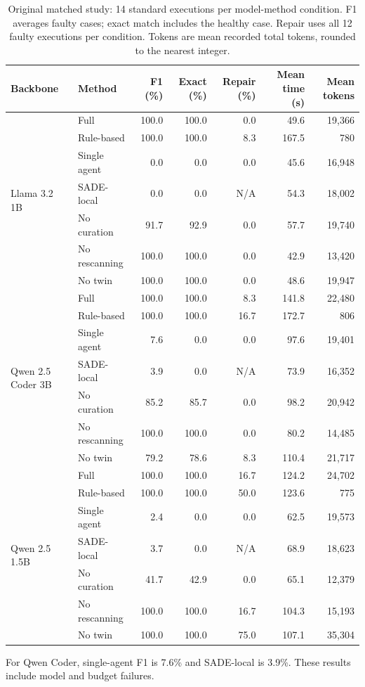 \documentclass[pdflatex,sn-mathphys-num,iicol]{sn-jnl}
\begin{document}
\begin{table}[t]
\caption{Original matched study: 14 standard executions per model-method condition. F1 averages faulty cases; exact match includes the healthy case. Repair uses all 12 faulty executions per condition. Tokens are mean recorded total tokens, rounded to the nearest integer.}\label{tab:core}
\centering\small
\begin{tabular}{@{}llrrrrr@{}}
\toprule
Backbone & Method & F1 (\%) & Exact (\%) & Repair (\%) & Mean time (s) & Mean tokens \\
\midrule
\multirow{7}{*}{Llama 3.2 1B} & Full & 100.0 & 100.0 & 0.0 & 49.6 & 19,366 \\
 & Rule-based & 100.0 & 100.0 & 8.3 & 167.5 & 780 \\
 & Single agent & 0.0 & 0.0 & 0.0 & 45.6 & 16,948 \\
 & SADE-local & 0.0 & 0.0 & N/A & 54.3 & 18,002 \\
 & No curation & 91.7 & 92.9 & 0.0 & 57.7 & 19,740 \\
 & No rescanning & 100.0 & 100.0 & 0.0 & 42.9 & 13,420 \\
 & No twin & 100.0 & 100.0 & 0.0 & 48.6 & 19,947 \\
\midrule
\multirow{7}{*}{Qwen 2.5 Coder 3B} & Full & 100.0 & 100.0 & 8.3 & 141.8 & 22,480 \\
 & Rule-based & 100.0 & 100.0 & 16.7 & 172.7 & 806 \\
 & Single agent & 7.6 & 0.0 & 0.0 & 97.6 & 19,401 \\
 & SADE-local & 3.9 & 0.0 & N/A & 73.9 & 16,352 \\
 & No curation & 85.2 & 85.7 & 0.0 & 98.2 & 20,942 \\
 & No rescanning & 100.0 & 100.0 & 0.0 & 80.2 & 14,485 \\
 & No twin & 79.2 & 78.6 & 8.3 & 110.4 & 21,717 \\
\midrule
\multirow{7}{*}{Qwen 2.5 1.5B} & Full & 100.0 & 100.0 & 16.7 & 124.2 & 24,702 \\
 & Rule-based & 100.0 & 100.0 & 50.0 & 123.6 & 775 \\
 & Single agent & 2.4 & 0.0 & 0.0 & 62.5 & 19,573 \\
 & SADE-local & 3.7 & 0.0 & N/A & 68.9 & 18,623 \\
 & No curation & 41.7 & 42.9 & 0.0 & 65.1 & 12,379 \\
 & No rescanning & 100.0 & 100.0 & 16.7 & 104.3 & 15,193 \\
 & No twin & 100.0 & 100.0 & 75.0 & 107.1 & 35,304 \\
\bottomrule
\end{tabular}
\end{table}
For Qwen Coder, single-agent F1 is 7.6\% and SADE-local is 3.9\%. These results include model and budget failures.
\end{document}
